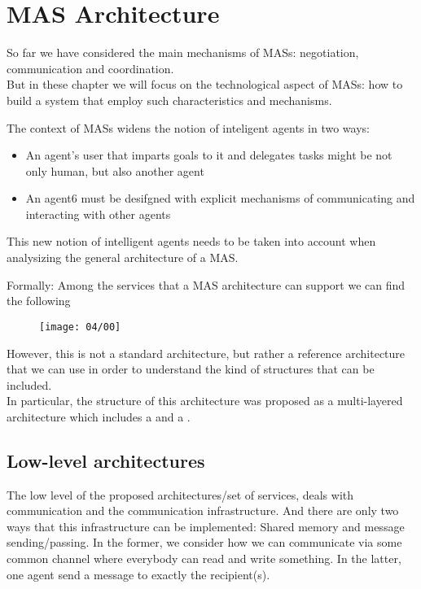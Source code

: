 

\chapter{MAS Architecture}
\minitoc

So far we have considered the main mechanisms of MASs: negotiation, communication and coordination.\\
But in these chapter we will focus on the technological aspect of MASs: how to build a system that employ such characteristics and mechanisms.

The context of MASs widens the notion of inteligent agents in two ways:
\begin{itemize}
\item An agent's user that imparts goals to it and delegates tasks might be not only human, but also another agent
\item An agent6 must be desifgned with explicit mechanisms of communicating and interacting with other agents
\end{itemize}
This new notion of intelligent agents needs to be taken into account when analysizing the general architecture of a MAS.

Formally:
Among the services that a MAS architecture can support we can find the following

\begin{figure}[!h]
\centering
\texttt{[image: 04/00]}
\end{figure}

However, this is not a standard architecture, but rather a reference architecture that we can use in order to understand the kind of structures that can be included.\\
In particular, the structure of this architecture was proposed as a multi-layered architecture which includes a  and a .

\section{Low-level architectures}
The low level of the proposed architectures/set of services, deals with communication and the communication infrastructure. And there are only two ways that this infrastructure can be implemented: Shared memory and message sending/passing.
In the former, we consider how we can communicate via some common  channel where everybody can read and write something. In the latter, one agent send a message to exactly the recipient(s).

